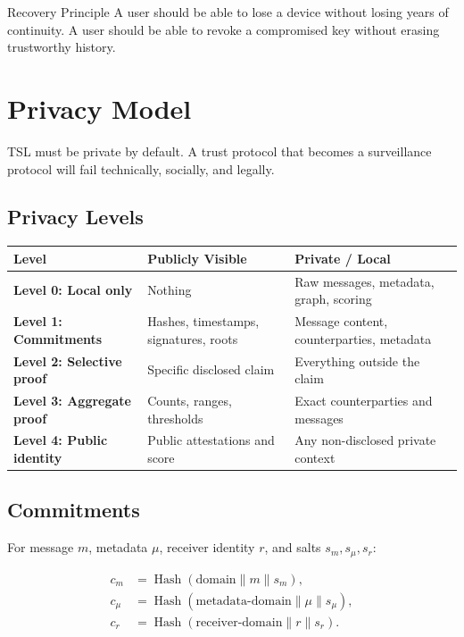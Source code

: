 \documentclass[11pt]{article}
\newcommand{\TSL}{\textsc{TSL}}
\newcommand{\hash}{\operatorname{Hash}}
\begin{document}
\begin{principlebox}{Recovery Principle}
A user should be able to lose a device without losing years of continuity. A user should be able to revoke a compromised key without erasing trustworthy history.
\end{principlebox}

\section{Privacy Model}

\TSL{} must be private by default. A trust protocol that becomes a surveillance protocol will fail technically, socially, and legally.

\subsection{Privacy Levels}

\begin{center}
\begin{tabularx}{\textwidth}{>{\bfseries}p{} X X}
\toprule
Level & Publicly Visible & Private / Local \\
\midrule
Level 0: Local only & Nothing & Raw messages, metadata, graph, scoring \\
Level 1: Commitments & Hashes, timestamps, signatures, roots & Message content, counterparties, metadata \\
Level 2: Selective proof & Specific disclosed claim & Everything outside the claim \\
Level 3: Aggregate proof & Counts, ranges, thresholds & Exact counterparties and messages \\
Level 4: Public identity & Public attestations and score & Any non-disclosed private context \\
\bottomrule
\end{tabularx}
\end{center}

\subsection{Commitments}

For message \(m\), metadata \(\mu\), receiver identity \(r\), and salts \(s_m, s_\mu, s_r\):

\begin{align}
    c_m &= \hash(\text{domain} \parallel m \parallel s_m), \\
    c_\mu &= \hash(\text{metadata-domain} \parallel \mu \parallel s_\mu), \\
    c_r &= \hash(\text{receiver-domain} \parallel r \parallel s_r).
\end{align}
\end{document}
